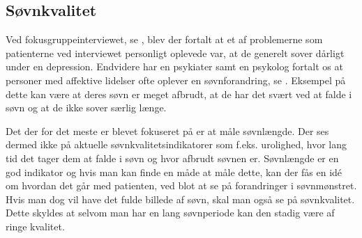 \subsection{Søvnkvalitet}
Ved fokusgruppeinterviewet, se \citep[Kapitel 1, Sektion 5]{misc:faellesrapp}, blev der fortalt at et af problemerne som patienterne ved interviewet personligt oplevede var, at de generelt sover dårligt under en depression.
Endvidere har en psykiater samt en psykolog fortalt os at personer med affektive lidelser ofte oplever en søvnforandring, se \citep[Kapitel 1, Sektion 3 og 4]{misc:faellesrapp}.
Eksempel på dette kan være at deres søvn er meget afbrudt, at de har det svært ved at falde i søvn og at de ikke sover særlig længe.

Det der for det meste er blevet fokuseret på er at måle søvnlængde. 
Der ses dermed ikke på aktuelle søvnkvalitetsindikatorer som f.eks. urolighed, hvor lang tid det tager dem at falde i søvn og hvor afbrudt søvnen er.
Søvnlængde er en god indikator og hvis man kan finde en måde at måle dette, kan der fås en idé om hvordan det går med patienten, ved blot at se på forandringer i søvnmønstret. 
Hvis man dog vil have det fulde billede af søvn, skal man også se på søvnkvalitet. 
Dette skyldes at selvom man har en lang søvnperiode kan den stadig være af ringe kvalitet.
